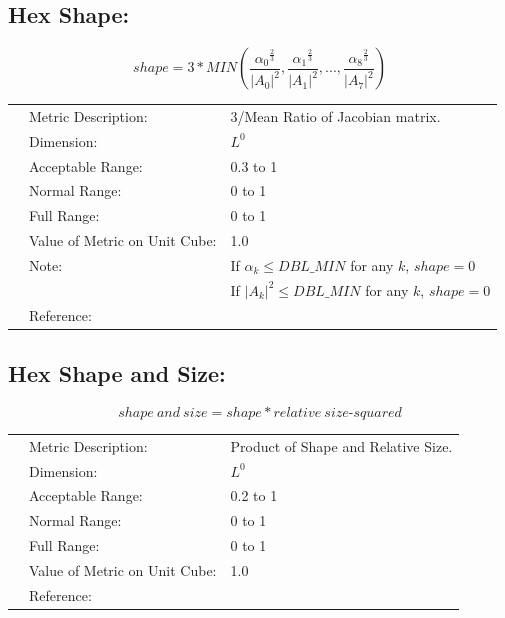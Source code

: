 \documentclass[12pt]{article}
\begin{document}
\subsection*{Hex Shape:}

\begin{displaymath}
shape = 3*MIN \left( \frac {{\alpha_0}^{\frac {2}{3}}} {|A_0|^2}, 
                     \frac {{\alpha_1}^{\frac {2}{3}}} {|A_1|^2},..., 
                     \frac {{\alpha_8}^{\frac {2}{3}}} {|A_7|^2} \right)
\end{displaymath}


\begin{tabular}{lll}
& Metric Description:  & 3/Mean Ratio of Jacobian matrix. \\ 
& Dimension:           & $L^0$       \\ 
& Acceptable Range:    & 0.3 to 1 \\ 
& Normal Range:        & 0 to 1 \\ 
& Full Range:          & 0 to 1 \\ 
& Value of Metric on Unit Cube:    & 1.0 \\
& Note:                & If $\alpha_k \leq DBL\_MIN$ for any $k$, $shape = 0$ \\ 
&                      & If $|A_k|^2 \leq DBL\_MIN$ for any $k$, $shape = 0$ \\ 
& Reference:           & \cite{four} \\
\end{tabular} 


\subsection*{Hex Shape and Size:}

\begin{displaymath}
shape~and~size = shape * relative~size \textrm{-}squared 
\end{displaymath}

\begin{tabular}{lll}
& Metric Description:  & Product of Shape and Relative Size.\\ 
& Dimension:           & $L^0$       \\ 
& Acceptable Range:    & 0.2 to 1 \\ 
& Normal Range:        & 0 to 1 \\ 
& Full Range:          & 0 to 1 \\ 
& Value of Metric on Unit Cube:    & 1.0 \\
& Reference:           & \cite{four} \\
\end{tabular} 
\end{document}
